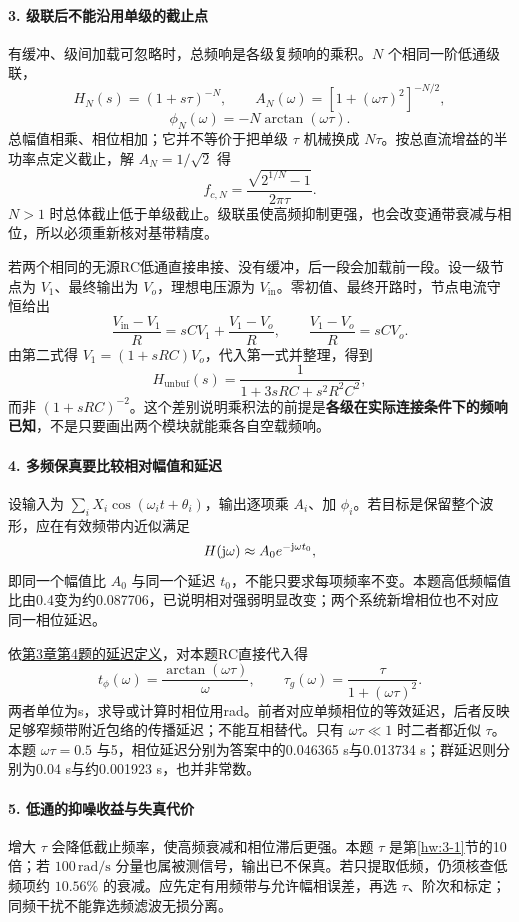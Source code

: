 \paragraph{3. 级联后不能沿用单级的截止点}
有缓冲、级间加载可忽略时，总频响是各级复频响的乘积。$N$ 个相同一阶低通级联，
\[
H_N(s)=(1+s\tau)^{-N},\qquad
A_N(\omega)=[1+(\omega\tau)^2]^{-N/2},
\]
\[
\phi_N(\omega)=-N\arctan(\omega\tau).
\]
总幅值相乘、相位相加；它并不等价于把单级 $\tau$ 机械换成 $N\tau$。按总直流增益的半功率点定义截止，解 $A_N=1/\sqrt2$ 得
\[
\boxed{f_{c,N}=\frac{\sqrt{2^{1/N}-1}}{2\pi\tau}}.
\]
$N>1$ 时总体截止低于单级截止。级联虽使高频抑制更强，也会改变通带衰减与相位，所以必须重新核对基带精度。

若两个相同的无源RC低通直接串接、没有缓冲，后一段会加载前一段。设一级节点为 $V_1$、最终输出为 $V_o$，理想电压源为 $V_{\mathrm{in}}$。零初值、最终开路时，节点电流守恒给出
\[
\frac{V_{\mathrm{in}}-V_1}{R}=sCV_1+\frac{V_1-V_o}{R},
\qquad \frac{V_1-V_o}{R}=sCV_o.
\]
由第二式得 $V_1=(1+sRC)V_o$，代入第一式并整理，得到
\[
H_{\mathrm{unbuf}}(s)=\frac1{1+3sRC+s^2R^2C^2},
\]
而非 $(1+sRC)^{-2}$。这个差别说明乘积法的前提是\textbf{各级在实际连接条件下的频响已知}，不是只要画出两个模块就能乘各自空载频响。

\paragraph{4. 多频保真要比较相对幅值和延迟}
设输入为 $\sum_iX_i\cos(\omega_it+\theta_i)$，输出逐项乘 $A_i$、加 $\phi_i$。若目标是保留整个波形，应在有效频带内近似满足
\[
H(\mathrm{j}\omega)\approx A_0e^{-\mathrm{j}\omega t_0},
\]
即同一个幅值比 $A_0$ 与同一个延迟 $t_0$，不能只要求每项频率不变。本题高低频幅值比由0.4变为约0.087706，已说明相对强弱明显改变；两个系统新增相位也不对应同一相位延迟。

依\hyperref[kn:3-4]{第3章第4题的延迟定义}，对本题RC直接代入得
\[
t_\phi(\omega)=\frac{\arctan(\omega\tau)}{\omega},
\qquad
\tau_g(\omega)=\frac{\tau}{1+(\omega\tau)^2}.
\]
两者单位为s，求导或计算时相位用rad。前者对应单频相位的等效延迟，后者反映足够窄频带附近包络的传播延迟；不能互相替代。只有 $\omega\tau\ll1$ 时二者都近似 $\tau$。本题 $\omega\tau=0.5$ 与5，相位延迟分别为答案中的0.046365 s与0.013734 s；群延迟则分别为0.04 s与约0.001923 s，也并非常数。

\paragraph{5. 低通的抑噪收益与失真代价}
增大 $\tau$ 会降低截止频率，使高频衰减和相位滞后更强。本题 $\tau$ 是第\ref{hw:3-1}节的10倍；若 $100\,\mathrm{rad/s}$ 分量也属被测信号，输出已不保真。若只提取低频，仍须核查低频项约 $10.56\%$ 的衰减。应先定有用频带与允许幅相误差，再选 $\tau$、阶次和标定；同频干扰不能靠选频滤波无损分离。


